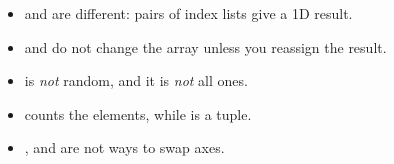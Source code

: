 \begin{traps}
\begin{itemize}
  \item \code{[20, 90]} and \code{[[20, 90]]} are different: pairs of index lists give a 1D result.
  \item {} and  do not change the array unless you reassign the result.
  \item {} is \emph{not} random, and it is \emph{not} all ones.
  \item {} counts the elements, while  is a tuple.
  \item {},  and  are not ways to swap axes.
\end{itemize}
\end{traps}

